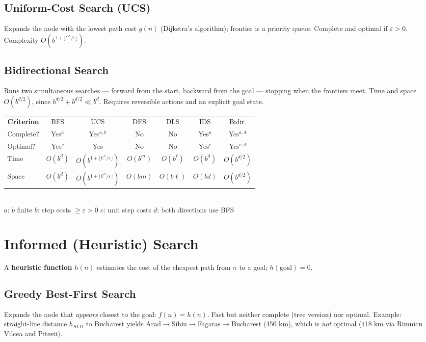 \subsection{Uniform-Cost Search (UCS)}
Expands the node with the lowest path cost $g(n)$ (Dijkstra's algorithm); frontier is a priority queue. Complete and optimal if $\varepsilon>0$. Complexity $O(b^{1+\lfloor C^{*}/\varepsilon\rfloor})$.

\subsection{Bidirectional Search}
Runs two simultaneous searches --- forward from the start, backward from the goal --- stopping when the frontiers meet. Time and space $O(b^{d/2})$, since $b^{d/2}+b^{d/2}\ll b^{d}$. Requires reversible actions and an explicit goal state.

\begin{center}\small
\begin{tabular}{lcccccc}
\rowcolor{navy}\color{white}\textbf{Criterion}&\color{gold}BFS&\color{gold}UCS&\color{gold}DFS&\color{gold}DLS&\color{gold}IDS&\color{gold}Bidir.\\
Complete?&Yes$^a$&Yes$^{a,b}$&No&No&Yes$^a$&Yes$^{a,d}$\\
\rowcolor{ivory}Optimal?&Yes$^c$&Yes&No&No&Yes$^c$&Yes$^{c,d}$\\
Time&$O(b^d)$&$O(b^{1+\lfloor C^*/\varepsilon\rfloor})$&$O(b^m)$&$O(b^\ell)$&$O(b^d)$&$O(b^{d/2})$\\
\rowcolor{ivory}Space&$O(b^d)$&$O(b^{1+\lfloor C^*/\varepsilon\rfloor})$&$O(bm)$&$O(b\ell)$&$O(bd)$&$O(b^{d/2})$\\
\end{tabular}\\[2pt]
{\scriptsize $a$: $b$ finite \quad $b$: step costs $\ge\varepsilon>0$ \quad $c$: unit step costs \quad $d$: both directions use BFS}
\end{center}

\section{Informed (Heuristic) Search}
A \textbf{heuristic function} $h(n)$ estimates the cost of the cheapest path from $n$ to a goal; $h(\text{goal})=0$.

\subsection{Greedy Best-First Search}
Expands the node that \emph{appears} closest to the goal: $f(n)=h(n)$. Fast but neither complete (tree version) nor optimal. Example: straight-line distance $h_{SLD}$ to Bucharest yields Arad$\to$Sibiu$\to$Fagaras$\to$Bucharest (450 km), which is \emph{not} optimal (418 km via Rimnicu Vilcea and Pitesti).

